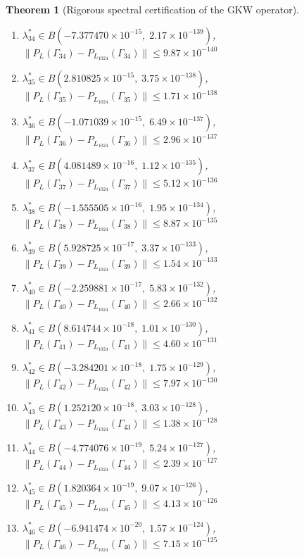 \documentclass[11pt]{article}
\newtheorem{theorem}{Theorem}
\begin{document}
\begin{theorem}[Rigorous spectral certification of the GKW operator]
\begin{enumerate}
\item $\lambda_{34}^* \in B(-7.377470 \times 10^{-15},\; 2.17 \times 10^{-139})$, \quad $\|P_L(\Gamma_{34}) - P_{L_{1024}}(\Gamma_{34})\| \leq 9.87 \times 10^{-140}$
\item $\lambda_{35}^* \in B(2.810825 \times 10^{-15},\; 3.75 \times 10^{-138})$, \quad $\|P_L(\Gamma_{35}) - P_{L_{1024}}(\Gamma_{35})\| \leq 1.71 \times 10^{-138}$
\item $\lambda_{36}^* \in B(-1.071039 \times 10^{-15},\; 6.49 \times 10^{-137})$, \quad $\|P_L(\Gamma_{36}) - P_{L_{1024}}(\Gamma_{36})\| \leq 2.96 \times 10^{-137}$
\item $\lambda_{37}^* \in B(4.081489 \times 10^{-16},\; 1.12 \times 10^{-135})$, \quad $\|P_L(\Gamma_{37}) - P_{L_{1024}}(\Gamma_{37})\| \leq 5.12 \times 10^{-136}$
\item $\lambda_{38}^* \in B(-1.555505 \times 10^{-16},\; 1.95 \times 10^{-134})$, \quad $\|P_L(\Gamma_{38}) - P_{L_{1024}}(\Gamma_{38})\| \leq 8.87 \times 10^{-135}$
\item $\lambda_{39}^* \in B(5.928725 \times 10^{-17},\; 3.37 \times 10^{-133})$, \quad $\|P_L(\Gamma_{39}) - P_{L_{1024}}(\Gamma_{39})\| \leq 1.54 \times 10^{-133}$
\item $\lambda_{40}^* \in B(-2.259881 \times 10^{-17},\; 5.83 \times 10^{-132})$, \quad $\|P_L(\Gamma_{40}) - P_{L_{1024}}(\Gamma_{40})\| \leq 2.66 \times 10^{-132}$
\item $\lambda_{41}^* \in B(8.614744 \times 10^{-18},\; 1.01 \times 10^{-130})$, \quad $\|P_L(\Gamma_{41}) - P_{L_{1024}}(\Gamma_{41})\| \leq 4.60 \times 10^{-131}$
\item $\lambda_{42}^* \in B(-3.284201 \times 10^{-18},\; 1.75 \times 10^{-129})$, \quad $\|P_L(\Gamma_{42}) - P_{L_{1024}}(\Gamma_{42})\| \leq 7.97 \times 10^{-130}$
\item $\lambda_{43}^* \in B(1.252120 \times 10^{-18},\; 3.03 \times 10^{-128})$, \quad $\|P_L(\Gamma_{43}) - P_{L_{1024}}(\Gamma_{43})\| \leq 1.38 \times 10^{-128}$
\item $\lambda_{44}^* \in B(-4.774076 \times 10^{-19},\; 5.24 \times 10^{-127})$, \quad $\|P_L(\Gamma_{44}) - P_{L_{1024}}(\Gamma_{44})\| \leq 2.39 \times 10^{-127}$
\item $\lambda_{45}^* \in B(1.820364 \times 10^{-19},\; 9.07 \times 10^{-126})$, \quad $\|P_L(\Gamma_{45}) - P_{L_{1024}}(\Gamma_{45})\| \leq 4.13 \times 10^{-126}$
\item $\lambda_{46}^* \in B(-6.941474 \times 10^{-20},\; 1.57 \times 10^{-124})$, \quad $\|P_L(\Gamma_{46}) - P_{L_{1024}}(\Gamma_{46})\| \leq 7.15 \times 10^{-125}$

\end{enumerate}
\end{theorem}
\end{document}
